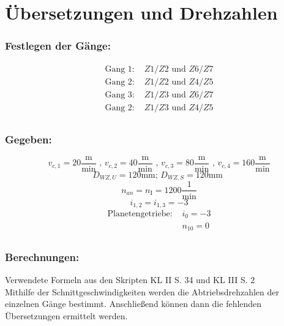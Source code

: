 \section{Übersetzungen und Drehzahlen}
\subsubsection{Festlegen der Gänge: }
\begin{align*}
\text{Gang 1: }& Z1/Z2 \text{ und } Z6/Z7 \\
\text{Gang 2: }& Z1/Z2 \text{ und } Z4/Z5 \\
\text{Gang 3: }& Z1/Z3 \text{ und } Z6/Z7 \\
\text{Gang 2: }& Z1/Z3 \text{ und } Z4/Z5 \\
\end{align*}
\subsubsection{Gegeben: }
\begin{center}
\[
	v_{c,1} = 20 \frac{\text{m}}{\text{min}} \text{ , } v_{c,2} = 40 \frac{\text{m}}{\text{min}} \text{ , } v_{c,3} = 80 \frac{\text{m}}{\text{min}} \text{ , } v_{c,4} = 160 \frac{\text{m}}{\text{min}}
\]
\[
	D_{WZ,U} = 120 \text{mm; }
	D_{WZ,S} = 120 \text{mm }
\]
\[
	n_{an} = n_{\mathord{\mathrm{I}}}= 1200 \frac{1}{\text{min}}
\]
\[
	i_{1,2} =  i_{1,3} = -3
\]
 \begin{align*}
\text{Planetengetriebe: }
		&i_{0} = -3 \\	
		&n_{10} = 0\\
\end{align*}
\subsubsection{Berechnungen:}
\end{center}
Verwendete Formeln aus den Skripten KL II S. 34 und KL III S. 2 \\
Mithilfe der Schnittgeschwindigkeiten werden die Abtriebsdrehzahlen der einzelnen Gänge bestimmt. Anschließend können dann die fehlenden Übersetzungen ermittelt werden.
